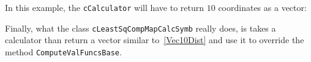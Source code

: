 In this example, the  {\tt cCalculator} will have to  return  $10$ coordinates as a
vector:
\begin{equation}
    [ f^1_x,  \dots  , f^5_x , f^1_y , \dots, f^5_y]   \label{Vec10Dist}
\end{equation}

Finally, what the class  {\tt cLeastSqCompMapCalcSymb} really does, is takes a
calculator than return a vector similar to~\ref{Vec10Dist} and use it to override
the method {\tt ComputeValFuncsBase}.



